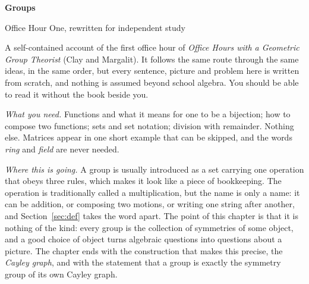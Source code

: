 \thispagestyle{empty}
\begin{center}
{\sffamily\bfseries\LARGE\color{big} Groups}\par\vspace{4pt}
{\sffamily\large Office Hour One, rewritten for independent study}\par\vspace{10pt}
\begin{minipage}{0.86\linewidth}\small\centering
A self-contained account of the first office hour of \emph{Office Hours with a Geometric Group
Theorist} (Clay and Margalit). It follows the same route through the same ideas, in the same order,
but every sentence, picture and problem here is written from scratch, and nothing is assumed
beyond school algebra. You should be able to read it without the book beside you.
\end{minipage}
\end{center}
\vspace{10pt}

\begin{prereq}
\emph{What you need.} Functions and what it means for one to be a bijection; how to compose two
functions; sets and set notation; division with remainder. Nothing else. Matrices appear in one
short example that can be skipped, and the words \emph{ring} and \emph{field} are never needed.
\end{prereq}

\begin{bigpic}
\emph{Where this is going.} A group is usually introduced as a set carrying one operation that
obeys three rules, which makes it look like a piece of bookkeeping. The operation is traditionally
called a multiplication, but the name is only a name: it can be addition, or composing two motions,
or writing one string after another, and Section~\ref{sec:def} takes the word apart. The point of this chapter is that it
is nothing of the kind: every group is the collection of symmetries of some object, and a good
choice of object turns algebraic questions into questions about a picture. The chapter ends with
the construction that makes this precise, the \emph{Cayley graph}, and with the statement that a
group is exactly the symmetry group of its own Cayley graph.
\end{bigpic}

